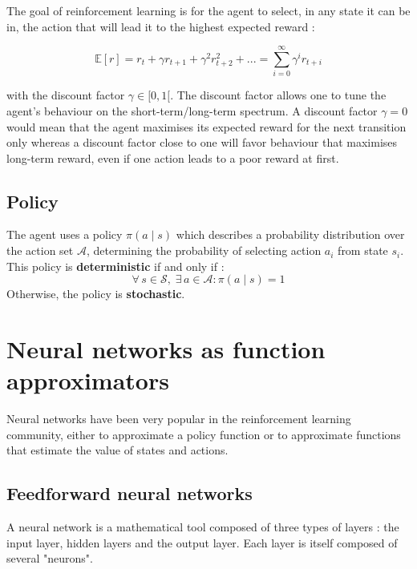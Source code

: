 The goal of reinforcement learning is for the agent to select, in any state it
can be in, the action that will lead it to the highest expected reward :

\begin{equation}
\mathbb{E}[r] = r_t + \gamma r_{t+1} + \gamma^2 r_{t+2}^2 + ... =
 \sum\limits_{i=0}^\infty \gamma^i r_{t+i}
\end{equation}

\noindent with the discount factor  $\gamma \in [0, 1[$.
The discount factor allows one to tune the agent's behaviour on the
short-term/long-term spectrum. A discount factor $\gamma=0$ would mean that the
agent maximises its expected reward for the next transition only whereas a
discount factor close to one will favor behaviour that maximises long-term
reward, even if one action leads to a poor reward at first.\\

\subsection{Policy}
The agent uses a policy $\pi(a \mid s)$ which describes a probability
distribution over the action set $\mathcal{A}$, determining the probability of
selecting action $a_i$ from state $s_i$. This policy is 
\textbf{deterministic} if and only if :
\begin{equation}
\forall\, s \in \mathcal{S},\; \exists\, a \in \mathcal{A} : \pi(a \mid s) = 1
\end{equation}
\noindent Otherwise, the policy is \textbf{stochastic}.


\section{Neural networks as function approximators}
Neural networks have been very popular in the reinforcement learning community,
either to approximate a policy function or to approximate functions that
estimate the value of states and actions.\\

\subsection{Feedforward neural networks}
A neural network is a mathematical tool composed of three types of layers : 
the input layer, hidden layers and the output layer. Each layer is itself
composed of several "neurons".\\

